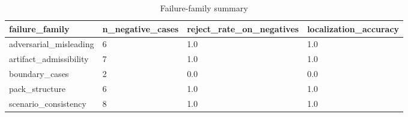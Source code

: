 \begin{table}[t]
\centering
\begin{tabular}{l | l | l | l}
\hline
failure_family & n_negative_cases & reject_rate_on_negatives & localization_accuracy \\
\hline
adversarial_misleading & 6 & 1.0 & 1.0 \\
artifact_admissibility & 7 & 1.0 & 1.0 \\
boundary_cases & 2 & 0.0 & 0.0 \\
pack_structure & 6 & 1.0 & 1.0 \\
scenario_consistency & 8 & 1.0 & 1.0 \\
\hline
\end{tabular}
\caption{Failure-family summary}
\end{table}

